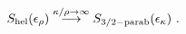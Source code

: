 \begin{equation} 
S_{\rm hel}(\epsilon _{\rho})\stackrel{\kappa/\rho\rightarrow \infty} 
{\longrightarrow} S_{\rm 3/2-parab}(\epsilon _{\kappa})~. 
\end{equation} 
